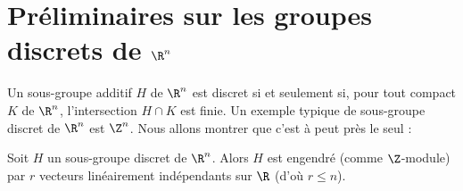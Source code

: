 \documentclass[11pt, useosf,
  title in boldface,
  theorem in new line,
  theorem numbering = section,
  number theorems separately,
]{simplivre}
\begin{document}
\section{Préliminaires sur les groupes discrets de \texorpdfstring{\( \R^n \)}{R\textasciicircum n}}\label{sec:préliminaires sur les groupes discrets de R n}

    Un sous-groupe additif \( H \) de \( \R^n \) est discret si et seulement si, pour tout compact \( K \) de \( \R^n \), l'intersection \( H \cap K \) est finie. Un exemple typique de sous-groupe discret de \( \R^n \) est \( \Z^n \). Nous allons montrer que c'est à peut près le seul :
    \begin{theorem}\label{thm:structure d'un réseau sur R}
        Soit \( H \) un sous-groupe discret de \( \R^n \). Alors \( H \) est engendré (comme \( \Z \)‑module) par \( r \) vecteurs linéairement indépendants sur \( \R \) (d'où \( r \leqslant n \)).
    \end{theorem}
\end{document}
